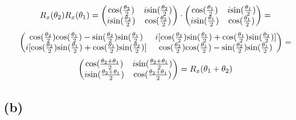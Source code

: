 \documentclass{article}
\begin{document}
$$R_x(\theta_2)R_x(\theta_1)=
\begin{pmatrix}
\textnormal{cos}(\frac{\theta_2}{2}) & i\textnormal{sin}(\frac{\theta_2}{2})\\
i\textnormal{sin}(\frac{\theta_2}{2}) & \textnormal{cos}(\frac{\theta_2}{2})
\end{pmatrix}\cdot
\begin{pmatrix}
\textnormal{cos}(\frac{\theta_1}{2}) & i\textnormal{sin}(\frac{\theta_1}{2})\\
i\textnormal{sin}(\frac{\theta_1}{2}) & \textnormal{cos}(\frac{\theta_1}{2})
\end{pmatrix}=
$$
$$
\begin{pmatrix}
\textnormal{cos}(\frac{\theta_2}{2})\textnormal{cos}(\frac{\theta_1}{2}) - \textnormal{sin}(\frac{\theta_2}{2})\textnormal{sin}(\frac{\theta_1}{2}) & i[\textnormal{cos}(\frac{\theta_2}{2})\textnormal{sin}(\frac{\theta_1}{2})+\textnormal{cos}(\frac{\theta_1}{2})\textnormal{sin}(\frac{\theta_2}{2})]\\
i[\textnormal{cos}(\frac{\theta_2}{2})\textnormal{sin}(\frac{\theta_1}{2})+\textnormal{cos}(\frac{\theta_1}{2})\textnormal{sin}(\frac{\theta_2}{2})] & \textnormal{cos}(\frac{\theta_2}{2})\textnormal{cos}(\frac{\theta_1}{2}) - \textnormal{sin}(\frac{\theta_2}{2})\textnormal{sin}(\frac{\theta_1}{2})
\end{pmatrix}=
$$
$$
\begin{pmatrix}
\textnormal{cos}(\frac{\theta_2+\theta_1}{2}) & i\textnormal{sin}(\frac{\theta_2+\theta_1}{2})\\
i\textnormal{sin}(\frac{\theta_2+\theta_1}{2}) & \textnormal{cos}(\frac{\theta_2+\theta_1}{2})
\end{pmatrix}=
R_x(\theta_1+\theta_2)
$$

\subsection*{(b)}
\end{document}
